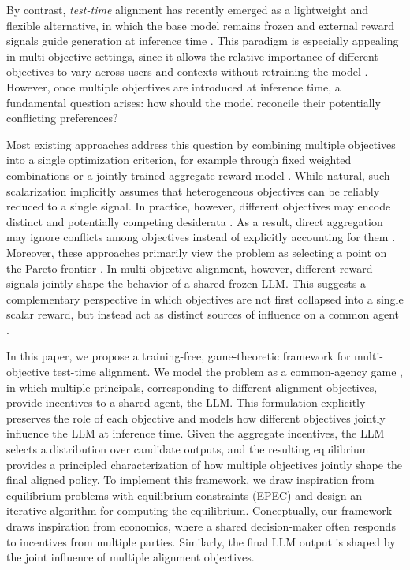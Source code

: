\documentclass{article}
\begin{document}
By contrast, \emph{test-time} alignment has recently emerged as a lightweight and flexible alternative, in which the base model remains frozen and external reward signals guide generation at inference time \citep{xu2024genarm,lin2025parm}. This paradigm is especially appealing in multi-objective settings, since it allows the relative importance of different objectives to vary across users and contexts without retraining the model \citep{chenpad,son2025robust}. However, once multiple objectives are introduced at inference time, a fundamental question arises: how should the model reconcile their potentially conflicting preferences?

Most existing approaches address this question by combining multiple objectives into a single optimization criterion, for example through fixed weighted combinations or a jointly trained aggregate reward model \citep{xu2024genarm,lin2025parm}. While natural, such scalarization implicitly assumes that heterogeneous objectives can be reliably reduced to a single signal. In practice, however, different objectives may encode distinct and potentially competing desiderata \citep{zhang2025diverging,im2025well}. As a result, direct aggregation may ignore conflicts among objectives instead of explicitly accounting for them \citep{chakraborty2024maxmin,shirali2025direct,ali2026operationalizing}. Moreover, these approaches primarily view the problem as selecting a point on the Pareto frontier \citep{lin2025parm}. In multi-objective alignment, however, different reward signals jointly shape the behavior of a shared frozen LLM. This suggests a complementary perspective in which objectives are not first collapsed into a single scalar reward, but instead act as distinct sources of influence on a common agent \citep{bernheim1986common}.

In this paper, we propose a training-free, game-theoretic framework for multi-objective test-time alignment. We model the problem as a common-agency game \citep{bernheim1986common}, in which multiple principals, corresponding to different alignment objectives, provide incentives to a shared agent, the LLM. This formulation explicitly preserves the role of each objective and models how different objectives jointly influence the LLM at inference time. Given the aggregate incentives, the LLM selects a distribution over candidate outputs, and the resulting equilibrium provides a principled characterization of how multiple objectives jointly shape the final aligned policy. To implement this framework, we draw inspiration from equilibrium problems with equilibrium constraints (EPEC) \citep{su2005equilibrium} and design an iterative algorithm for computing the equilibrium. Conceptually, our framework draws inspiration from economics, where a shared decision-maker often responds to incentives from multiple parties. Similarly, the final LLM output is shaped by the joint influence of multiple alignment objectives.
\end{document}
